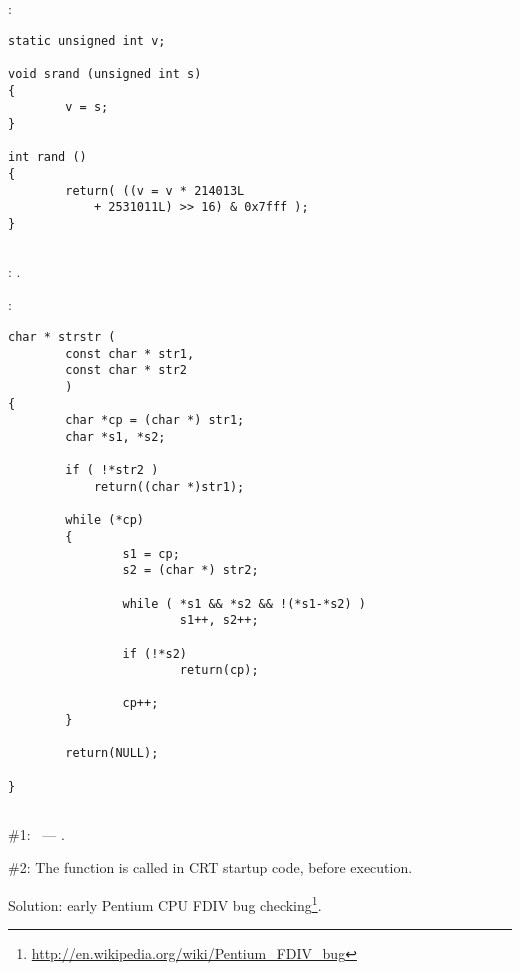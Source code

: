 :

\begin{lstlisting}
static unsigned int v;

void srand (unsigned int s)
{
        v = s;
}

int rand ()
{
        return( ((v = v * 214013L
            + 2531011L) >> 16) & 0x7fff );
}
\end{lstlisting}

\subsection{}

: .

:

\begin{lstlisting}
char * strstr (
        const char * str1,
        const char * str2
        )
{
        char *cp = (char *) str1;
        char *s1, *s2;

        if ( !*str2 )
            return((char *)str1);

        while (*cp)
        {
                s1 = cp;
                s2 = (char *) str2;

                while ( *s1 && *s2 && !(*s1-*s2) )
                        s1++, s2++;

                if (!*s2)
                        return(cp);

                cp++;
        }

        return(NULL);

}
\end{lstlisting}

\subsection{}

 \#1:   ~--- 
.

 \#2: 
{The function is called in \ac{CRT} startup code, before \main execution}.

{Solution: early Pentium CPU FDIV bug checking}\footnote{\url{http://en.wikipedia.org/wiki/Pentium_FDIV_bug}}.

